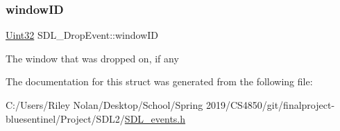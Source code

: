 \subsubsection{\texorpdfstring{windowID}{windowID}}
{\footnotesize\ttfamily \mbox{\hyperlink{_s_d_l__stdinc_8h_add440eff171ea5f55cb00c4a9ab8672d}{Uint32}} S\+D\+L\+\_\+\+Drop\+Event\+::window\+ID}

The window that was dropped on, if any 

The documentation for this struct was generated from the following file\+:\begin{DoxyCompactItemize}
\item 
C\+:/\+Users/\+Riley Nolan/\+Desktop/\+School/\+Spring 2019/\+C\+S4850/git/finalproject-\/bluesentinel/\+Project/\+S\+D\+L2/\mbox{\hyperlink{_s_d_l__events_8h}{S\+D\+L\+\_\+events.\+h}}\end{DoxyCompactItemize}
